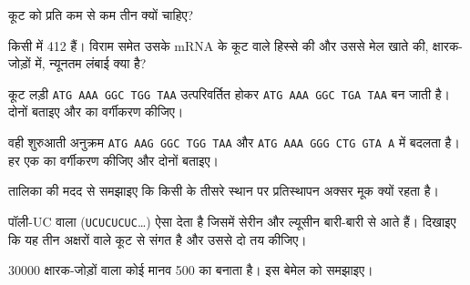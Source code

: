 \begin{exercise}[$\star$]\label{exo:g11:gene-expression:5}
कूट को प्रति  कम से कम तीन  क्यों चाहिए?
\end{exercise}

\begin{exercise}[$\star\star$]\label{exo:g11:gene-expression:6}
किसी  में 412  हैं। विराम  समेत उसके mRNA के कूट
वाले हिस्से की और उससे मेल खाते  की, क्षारक-जोड़ों में, न्यूनतम लंबाई
क्या है?
\end{exercise}

\begin{exercise}[$\star\star$]\label{exo:g11:gene-expression:7}
कूट लड़ी \texttt{ATG AAA GGC TGG TAA} उत्परिवर्तित होकर
\texttt{ATG AAA GGC TGA TAA} बन जाती है। दोनों  बताइए और
 का वर्गीकरण कीजिए।
\end{exercise}

\begin{exercise}[$\star\star$]\label{exo:g11:gene-expression:8}
वही शुरुआती अनुक्रम \texttt{ATG AAG GGC TGG TAA} और
\texttt{ATG AAA GGG CTG GTA A} में बदलता है। हर एक का वर्गीकरण कीजिए और
दोनों  बताइए।
\end{exercise}

\begin{exercise}[$\star\star$]\label{exo:g11:gene-expression:9}
तालिका की मदद से समझाइए कि किसी  के तीसरे स्थान पर प्रतिस्थापन अक्सर
मूक क्यों रहता है।
\end{exercise}

\begin{exercise}[$\star\star$]\label{exo:g11:gene-expression:10}
पॉली-UC वाला  (\texttt{UCUCUCUC}\dots) ऐसा  देता है जिसमें
सेरीन और ल्यूसीन बारी-बारी से आते हैं। दिखाइए कि यह तीन अक्षरों वाले कूट
से संगत है और उससे दो  तय कीजिए।
\end{exercise}

\begin{exercise}[$\star\star$]\label{exo:g11:gene-expression:11}
\num{30000} क्षारक-जोड़ों वाला कोई मानव  500  का 
बनाता है। इस बेमेल को समझाइए।
\end{exercise}

